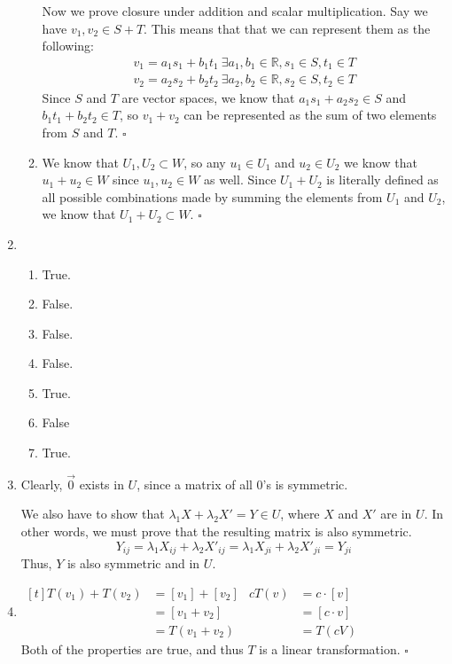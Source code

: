 \documentclass[12pt]{article}
\begin{document}
\begin{enumerate}
\begin{enumerate}
                        Now we prove closure under addition and scalar multiplication.
                        Say we have $v_1, v_2 \in S+T$.
                        This means that that we can represent them as the following:
                        \begin{gather*}
                              v_1=a_1 s_1 + b_1 t_1\ \exists a_1, b_1 \in \mathbb{R}, s_1 \in S, t_1 \in T \\
                              v_2=a_2 s_2 + b_2 t_2\ \exists a_2, b_2 \in \mathbb{R}, s_2 \in S, t_2 \in T
                        \end{gather*}
                        Since $S$ and $T$ are vector spaces, we know that $a_1 s_1 +a_2 s_2 \in S$ and $b_1 t_1 + b_2 t_2 \in T$,
                        so $v_1+v_2$ can be represented as the sum of two elements from $S$ and $T$. $\square$
                  \item We know that $U_1, U_2 \subset W$, so any $u_1 \in U_1$ and $u_2 \in U_2$ we know that $u_1+u_2 \in W$
                        since $u_1, u_2 \in W$ as well.
                        Since $U_1+U_2$ is literally defined as all possible combinations made by summing the elements from $U_1$ and $U_2$,
                        we know that $U_1+U_2 \subset W$. $\square$
            \end{enumerate}
      \item \begin{enumerate}
                  \item True.
                  \item False.
                  \item False.
                  \item False.
                  \item True.
                  \item False
                  \item True.
            \end{enumerate}
      \item Clearly, $\vec{0}$ exists in $U$, since a matrix of all $0$'s is symmetric.

            We also have to show that $\lambda_1 X + \lambda_2 X' = Y \in U$, where $X$ and $X'$ are in $U$.
            In other words, we must prove that the resulting matrix is also symmetric.
            \[Y_{ij}=\lambda_1 X_{ij}+\lambda_2 X'_{ij}=\lambda_1 X_{ji}+\lambda_2 X'_{ji}=Y_{ji}\]
            Thus, $Y$ is also symmetric and in $U$.
      \item \hfill$\begin{aligned}[t]
                        T(v_1)+T(v_2) & =[v_1]+[v_2] & cT(v) & =c \cdot [v] \\
                                      & = [v_1+v_2]  &       & =[c \cdot v] \\
                                      & = T(v_1+v_2) &       & =T(cV)\quad
                  \end{aligned}$\hfill\null \\
            Both of the properties are true, and thus $T$ is a linear transformation. $\square$


\end{enumerate}
\end{document}

